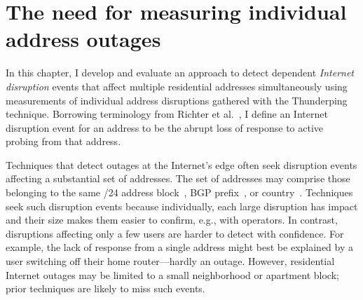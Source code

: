 
\chapter{The need for measuring individual address outages}
\label{cpt:corrfails}

In this chapter, I develop and evaluate an approach to detect
dependent \emph{Internet disruption} events that affect multiple residential
addresses simultaneously using measurements of individual address disruptions
gathered with the Thunderping technique. Borrowing terminology from
Richter et al.~\cite{advancing-outage-art}, I define an Internet
disruption event for an address to be the abrupt loss of response to active probing
from that address.

Techniques that detect outages at the Internet's edge often seek
disruption events affecting a substantial set of addresses. The set of addresses may comprise
those belonging to the same /24
address block~\cite{trinocular,advancing-outage-art}, BGP
prefix~\cite{hubble}, or country~\cite{dainotti-imc11}.  
Techniques seek such disruption events because individually, each large disruption has
impact and their size makes them easier to confirm, e.g., with operators. In contrast, disruptions
affecting only a few users are harder to detect with confidence.  For example, the
lack of response from a single address might best be explained by a
user switching off their home router---hardly an outage.
However, residential Internet
outages may be limited to a small neighborhood or apartment block; prior
techniques are likely to miss such events.


